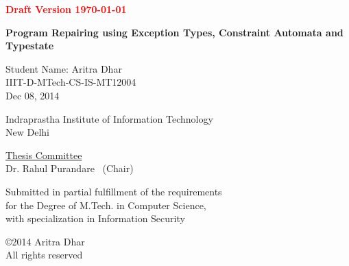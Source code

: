 

\def\addrone{IIIT-Delhi, Okhla Phase 3}
\def\addrtwo{New Delhi, India}

\begin{center}
\textcolor{red}{\textbf{Draft Version \today}}
\end{center}


\def\degree{M.Tech. in Computer Science with Specialization in Information Security}


\def\submissiondate{December 08, 2014}

\def\supervisorone{Dr. Rahul Purandare}


%
%
%
%
%
%

\thispagestyle{empty}

\begin{center}

{\LARGE \bf {Program Repairing using Exception Types, Constraint Automata and Typestate}

 }  
 \vspace{.3in}
 
 {\Large{Student Name: Aritra Dhar}} \\  
 \vspace{.1in} 
 IIIT-D-MTech-CS-IS-MT12004 \\

 Dec 08, 2014 \\
  
    \vspace{.35in}

  \vspace{.25in}

{Indraprastha Institute of Information Technology\\
New Delhi}

\vspace{.35in}  {\underline{Thesis Committee}} \\ \supervisorone               
~(Chair)
  \\ \vspace{.35in}


 {Submitted in partial fulfillment of the requirements \\for the Degree of M.Tech. in Computer Science, \\ with specialization in Information Security}

\vspace{1.2in}


\copyright 2014 Aritra Dhar \\ All rights reserved \\
\vspace{.8in}


\end{center}



